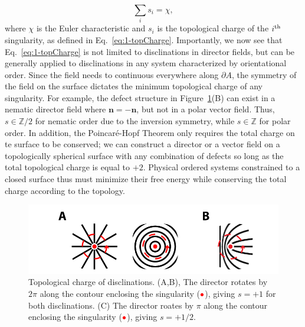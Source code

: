 \begin{equation}
  \sum\limits_i s_i = \chi,\label{e:1-PH}
\end{equation}
where $\chi$ is the Euler characteristic and $s_i$ is the topological charge of the $i^{\rm th}$ singularity, as defined in Eq.~\ref{eq:1-topCharge}.
Importantly, we now see that Eq.~\ref{eq:1-topCharge} is not limited to disclinations in director fields, but can be generally applied to disclinations in any system characterized by orientational order.
Since the field needs to continuous everywhere along $\partial A$, the symmetry of the field on the surface dictates the minimum topological charge of any singularity.
For example, the defect structure in Figure~\ref{f:1-TopCharge}(B) can exist in a nematic director field where $\mathbf{n} = \mathbf{-n}$, but not in a polar vector field.
Thus, $s \in \mathbb{Z}/2$ for nematic order due to the inversion symmetry, while $s \in \mathbb{Z}$ for polar order.
In addition, the Poincar\'e-Hopf Theorem only requires the total charge on te surface to be conserved; we can construct a director or a vector field on a topologically spherical surface with any combination of defects so long as the total topological charge is equal to $+2$.
Physical ordered systems constrained to a closed surface thus must minimize their free energy while conserving the total charge according to the topology.
\begin{figure}
  \centering
  \includegraphics{figures/C1/Ch1-Figs_TopCharge.png}
  \caption{Topological charge of disclinations.
  (A,B), The director rotates by $2\pi$ along the contour enclosing the singularity (${\color{red} \bullet}$), giving $s = +1$ for both disclinations.
  (C) The director roates by $\pi$ along the contour enclosing the singularity (${\color{red} \bullet}$), giving $s = +1/2$.}\label{f:1-TopCharge}
\end{figure}

